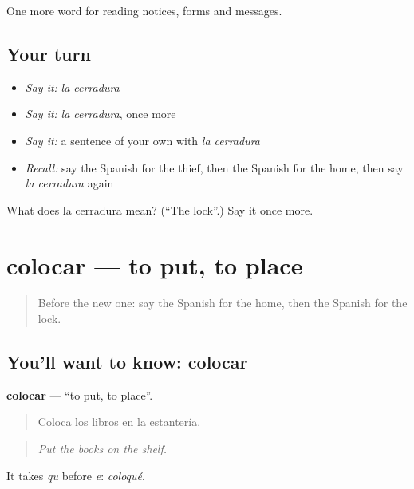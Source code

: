 \begin{grammarlens}[title={What you've built}]
One more word for reading notices, forms and messages.
\end{grammarlens}

\subsection*{Your turn}
\begin{itemize}
\raggedright
  \item \emph{Say it:} \emph{la cerradura}
  \item \emph{Say it:} \emph{la cerradura}, once more
  \item \emph{Say it:} a sentence of your own with \emph{la cerradura}
  \item \emph{Recall:} say the Spanish for the thief, then the Spanish for the home, then say \emph{la cerradura} again
\end{itemize}

\begin{tcolorbox}[breakable,colback=teal!4,colframe=teal!35!black,title={Before you move on}]
What does la cerradura mean? (\textquotedblleft{}The lock\textquotedblright{}.) Say it once more.
\end{tcolorbox}
\section[colocar]{colocar — to put, to place}

\label{lesson:ES-C496-colocar}



\begin{quote}
Before the new one: say the Spanish for the home, then the Spanish for the lock.
\end{quote}

\subsection*{You'll want to know: colocar}
\textbf{colocar} — \textquotedblleft{}to put, to place\textquotedblright{}.

\begin{quote}
Coloca los libros en la estantería.
\end{quote}

\begin{quote}
\emph{Put the books on the shelf.}
\end{quote}

It takes \emph{qu} before \emph{e}: \emph{coloqué}.

